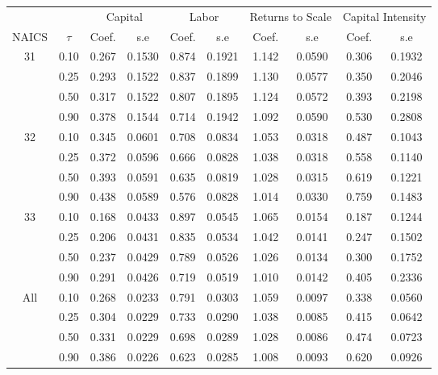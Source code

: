 \begin{table}[H]
\centering
\begin{tabular}{cccccccccc}
  \hline\hline & & \multicolumn{2}{c}{Capital}  & \multicolumn{2}{c}{Labor} & \multicolumn{2}{c}{Returns to Scale} & \multicolumn{2}{c}{Capital Intensity}\\ \cmidrule(lr){3-4} \cmidrule(lr){5-6} \cmidrule(lr){7-8} \cmidrule(lr){9-10}NAICS & $\tau$ & Coef. & s.e & Coef. & s.e & Coef. & s.e & Coef. & s.e \\ 
  \hline
31 & 0.10 & 0.267 & 0.1530 & 0.874 & 0.1921 & 1.142 & 0.0590 & 0.306 & 0.1932 \\ 
   & 0.25 & 0.293 & 0.1522 & 0.837 & 0.1899 & 1.130 & 0.0577 & 0.350 & 0.2046 \\ 
   & 0.50 & 0.317 & 0.1522 & 0.807 & 0.1895 & 1.124 & 0.0572 & 0.393 & 0.2198 \\ 
   & 0.90 & 0.378 & 0.1544 & 0.714 & 0.1942 & 1.092 & 0.0590 & 0.530 & 0.2808 \\ 
  32 & 0.10 & 0.345 & 0.0601 & 0.708 & 0.0834 & 1.053 & 0.0318 & 0.487 & 0.1043 \\ 
   & 0.25 & 0.372 & 0.0596 & 0.666 & 0.0828 & 1.038 & 0.0318 & 0.558 & 0.1140 \\ 
   & 0.50 & 0.393 & 0.0591 & 0.635 & 0.0819 & 1.028 & 0.0315 & 0.619 & 0.1221 \\ 
   & 0.90 & 0.438 & 0.0589 & 0.576 & 0.0828 & 1.014 & 0.0330 & 0.759 & 0.1483 \\ 
  33 & 0.10 & 0.168 & 0.0433 & 0.897 & 0.0545 & 1.065 & 0.0154 & 0.187 & 0.1244 \\ 
   & 0.25 & 0.206 & 0.0431 & 0.835 & 0.0534 & 1.042 & 0.0141 & 0.247 & 0.1502 \\ 
   & 0.50 & 0.237 & 0.0429 & 0.789 & 0.0526 & 1.026 & 0.0134 & 0.300 & 0.1752 \\ 
   & 0.90 & 0.291 & 0.0426 & 0.719 & 0.0519 & 1.010 & 0.0142 & 0.405 & 0.2336 \\ 
  All & 0.10 & 0.268 & 0.0233 & 0.791 & 0.0303 & 1.059 & 0.0097 & 0.338 & 0.0560 \\ 
   & 0.25 & 0.304 & 0.0229 & 0.733 & 0.0290 & 1.038 & 0.0085 & 0.415 & 0.0642 \\ 
   & 0.50 & 0.331 & 0.0229 & 0.698 & 0.0289 & 1.028 & 0.0086 & 0.474 & 0.0723 \\ 
   & 0.90 & 0.386 & 0.0226 & 0.623 & 0.0285 & 1.008 & 0.0093 & 0.620 & 0.0926 \\ 
   \hline
\end{tabular}
\end{table}
